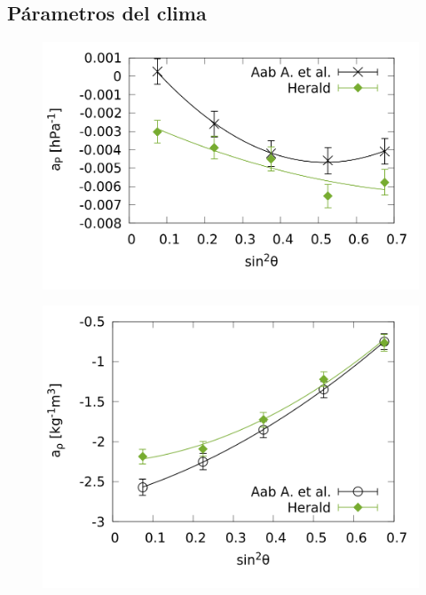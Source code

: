 \subsection{Párametros del clima}

\begin{figure}[H]
	\centering
	\includegraphics[width=\linewidth]{ap.png}
\end{figure}


\begin{figure}[H]
	\centering
	\includegraphics[width=\linewidth]{arho.png}
\end{figure}


